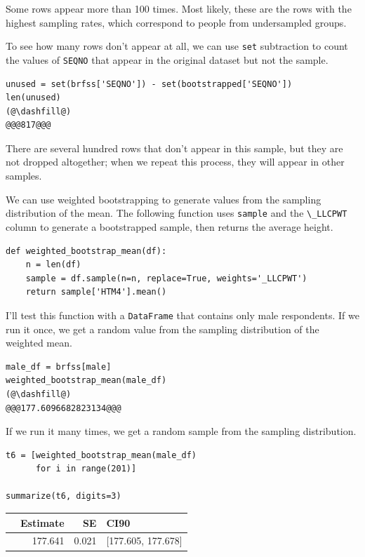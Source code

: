 Some rows appear more than 100 times. Most likely, these are the rows
with the highest sampling rates, which correspond to people from
undersampled groups.

To see how many rows don't appear at all, we can use
\passthrough{\lstinline!set!} subtraction to count the values of
\passthrough{\lstinline!SEQNO!} that appear in the original dataset but
not the sample.

\begin{lstlisting}[]
unused = set(brfss['SEQNO']) - set(bootstrapped['SEQNO'])
len(unused)
(@\dashfill@)
@@@817@@@
\end{lstlisting}

There are several hundred rows that don't appear in this sample, but
they are not dropped altogether; when we repeat this process, they will
appear in other samples.

We can use weighted bootstrapping to generate values from the sampling
distribution of the mean. The following function uses
\passthrough{\lstinline!sample!} and the
\passthrough{\lstinline!\_LLCPWT!} column to generate a bootstrapped
sample, then returns the average height.

\begin{lstlisting}[]
def weighted_bootstrap_mean(df):
    n = len(df)
    sample = df.sample(n=n, replace=True, weights='_LLCPWT')
    return sample['HTM4'].mean()
\end{lstlisting}

I'll test this function with a \passthrough{\lstinline!DataFrame!} that
contains only male respondents. If we run it once, we get a random value
from the sampling distribution of the weighted mean.

\begin{lstlisting}[]
male_df = brfss[male]
weighted_bootstrap_mean(male_df)
(@\dashfill@)
@@@177.6096682823134@@@
\end{lstlisting}

If we run it many times, we get a random sample from the sampling
distribution.

\begin{lstlisting}[]
t6 = [weighted_bootstrap_mean(male_df) 
      for i in range(201)]

summarize(t6, digits=3)
\end{lstlisting}

\begin{tabular}{lrrl}
\midrule
{} &  Estimate &     SE &                CI90 \\
\midrule
{} &   177.641 &  0.021 &  [177.605, 177.678] \\
\midrule
\end{tabular}

